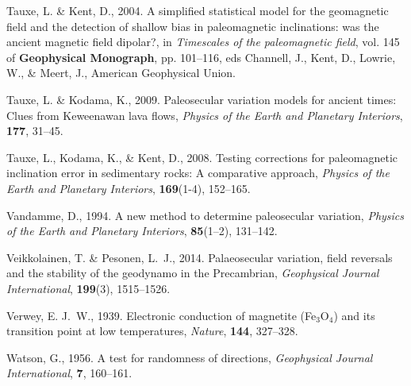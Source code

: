 \documentclass[11pt,letterpaper]{article}
\begin{document}
\begin{thebibliography}{49}
Tauxe, L. \& Kent, D., 2004.
\newblock A simplified statistical model for the geomagnetic field and the
  detection of shallow bias in paleomagnetic inclinations: was the ancient
  magnetic field dipolar?, in {\em Timescales of the paleomagnetic field\/},
  vol. 145 of {\bf Geophysical Monograph}, pp. 101--116, eds Channell, J.,
  Kent, D., Lowrie, W., \& Meert, J., American Geophysical Union.

Tauxe, L. \& Kodama, K., 2009.
\newblock Paleosecular variation models for ancient times: Clues from
  {K}eweenawan lava flows, {\it Physics of the Earth and Planetary
  Interiors\/}, {\bf 177}, 31--45.

Tauxe, L., Kodama, K., \& Kent, D., 2008.
\newblock Testing corrections for paleomagnetic inclination error in
  sedimentary rocks: A comparative approach, {\it Physics of the Earth and
  Planetary Interiors\/}, {\bf 169}(1-4), 152--165.

Vandamme, D., 1994.
\newblock A new method to determine paleosecular variation, {\it Physics of the
  Earth and Planetary Interiors\/}, {\bf 85}(1--2), 131--142.

Veikkolainen, T. \& Pesonen, L.~J., 2014.
\newblock Palaeosecular variation, field reversals and the stability of the
  geodynamo in the {P}recambrian, {\it Geophysical Journal International\/},
  {\bf 199}(3), 1515--1526.

Verwey, E. J.~W., 1939.
\newblock Electronic conduction of magnetite ({F}e$_3${O}$_4$) and its
  transition point at low temperatures, {\it Nature\/}, {\bf 144}, 327--328.
  
Watson, G., 1956.
\newblock A test for randomness of directions, {\it Geophysical Journal
  International\/}, {\bf 7}, 160--161.

\end{thebibliography}


%
%
\end{document}
